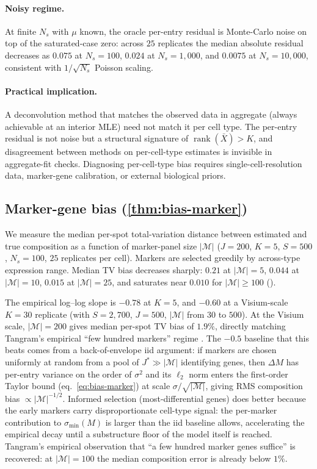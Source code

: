 \paragraph{Noisy regime.} At finite $N_s$ with $\mu$ known, the
oracle per-entry residual is Monte-Carlo noise on top of the
saturated-case zero: across $25$ replicates the median absolute
residual decreases as $0.075$ at $N_s = 100$, $0.024$ at $N_s =
1{,}000$, and $0.0075$ at $N_s = 10{,}000$, consistent with
$1/\sqrt{N_s}$ Poisson scaling.

\paragraph{Practical implication.} A deconvolution method that
matches the observed data in aggregate (always achievable at an
interior MLE) need not match it per cell type. The per-entry
residual is not noise but a structural signature of
$\operatorname{rank}(\bar X) > K$, and disagreement between methods
on per-cell-type estimates is invisible in aggregate-fit checks.
Diagnosing per-cell-type bias requires single-cell-resolution data,
marker-gene calibration, or external biological priors.

\subsection{Marker-gene bias (\cref{thm:bias-marker})}

We measure the median per-spot total-variation distance between
estimated and true composition as a function of marker-panel size
$|\mathcal{M}|$ ($J = 200$, $K = 5$, $S = 500$, $N_s = 100$,
$25$ replicates per cell). Markers are selected greedily by
across-type expression range. Median TV bias decreases sharply:
$0.21$ at $|\mathcal{M}| = 5$, $0.044$ at $|\mathcal{M}| = 10$,
$0.015$ at $|\mathcal{M}| = 25$, and saturates near $0.010$ for
$|\mathcal{M}| \geq 100$ ().

The empirical log--log slope is $-0.78$ at $K = 5$, and $-0.60$ at
a Visium-scale $K = 30$ replicate (with $S = 2{,}700$, $J = 500$,
$|\mathcal{M}|$ from $30$ to $500$). At the Visium scale, $|\mathcal
{M}| = 200$ gives median per-spot TV bias of $1.9\%$, directly
matching Tangram's empirical ``few hundred markers'' regime
\citep{biancalani2021deep}. The $-0.5$ baseline that
this beats comes from a back-of-envelope iid argument: if markers
are chosen uniformly at random from a pool of $J^* \gg |\mathcal M|$
identifying genes, then $\Delta M$ has per-entry variance on the
order of $\sigma^2$ and its $\ell_2$ norm enters the
first-order Taylor bound (eq.~\eqref{eq:bias-marker}) at scale
$\sigma / \sqrt{|\mathcal M|}$, giving RMS composition bias
$\propto |\mathcal M|^{-1/2}$. Informed selection (most-differential
genes) does better because the early markers carry disproportionate
cell-type signal: the per-marker contribution to $\sigma_{\min}(M)$
is larger than the iid baseline allows, accelerating the empirical
decay until a substructure floor of the model itself is reached. Tangram's empirical
observation that ``a few hundred marker genes suffice''
\citep{biancalani2021deep} is recovered: at $|\mathcal{M}| = 100$
the median composition error is already below $1\%$.

